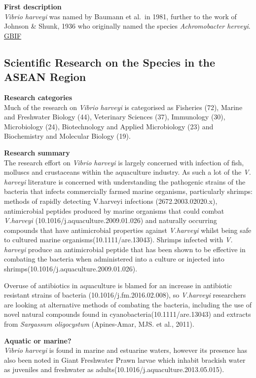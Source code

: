 \documentclass[]{book}
\theoremstyle{definition}
\theoremstyle{definition}
\theoremstyle{definition}
\theoremstyle{remark}
\begin{document}
\textbf{First description}\\
\emph{Vibrio harveyi} was named by Baumann et al.~in 1981, further to
the work of Johnson \& Shunk, 1936 who originally named the species
\emph{Achromobacter herveyi}.
\href{https://www.gbif.org/species/5427692}{GBIF}

\hypertarget{scientific-research-on-the-species-in-the-asean-region-6}{%
\subsection{Scientific Research on the Species in the ASEAN
Region}\label{scientific-research-on-the-species-in-the-asean-region-6}}

\textbf{Research categories}\\
Much of the research on \emph{Vibrio harveyi} is categorised as
Fisheries (72), Marine and Freshwater Biology (44), Veterinary Sciences
(37), Immunology (30), Microbiology (24), Biotechnology and Applied
Microbiology (23) and Biochemistry and Molecular Biology (19).

\textbf{Research summary}\\
The research effort on \emph{Vibrio harveyi} is largely concerned with
infection of fish, molluscs and crustaceans within the aquaculture
industry. As such a lot of the \emph{V. harveyi} literature is concerned
with understanding the pathogenic strains of the bacteria that infects
commercially farmed marine organisms, particularly shrimps: methods of
rapidly detecting V.harveyi infections (2672.2003.02020.x),
antimicrobial peptides produced by marine organisms that could combat
\emph{V.harveyi} (10.1016/j.aquaculture.2009.01.026) and naturally
occurring compounds that have antimicrobial properties against
\emph{V.harveyi} whilst being safe to cultured marine
organisms(10.1111/are.13043). Shrimps infected with \emph{V. harveyi}
produce an antimicrobial peptide that has been shown to be effective in
combating the bacteria when administered into a culture or injected into
shrimps(10.1016/j.aquaculture.2009.01.026).

Overuse of antibiotics in aquaculture is blamed for an increase in
antibiotic resistant strains of bacteria (10.1016/j.fm.2016.02.008), so
\emph{V.harveyi} researchers are looking at alternative methods of
combating the bacteria, including the use of novel natural compounds
found in cyanobacteria(10.1111/are.13043) and extracts from
\emph{Sargassum oligocystum} (Apines-Amar, MJS. et al., 2011).

\textbf{Aquatic or marine?}\\
\emph{Vibrio harveyi} is found in marine and estuarine waters, however
its presence has also been noted in Giant Freshwater Prawn larvae which
inhabit brackish water as juveniles and freshwater as
adults(10.1016/j.aquaculture.2013.05.015).
\end{document}
